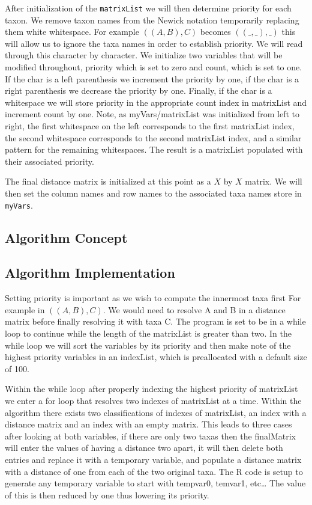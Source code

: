 \documentclass{article}
\begin{document}
After initialization of the {\tt matrixList} we will then determine priority for each taxon. We remove taxon names from the Newick notation temporarily replacing them white whitespace. For example $((A,B),C)$ becomes $((\_,\_),\_)$ this will allow us to ignore the taxa names in order to establish priority. We will read through this character by character. We initialize two variables that will be modified throughout, priority which is set to zero and count, which is set to one. If the char is a left parenthesis we increment the priority by one, if the char is a right parenthesis we decrease the priority by one. Finally, if the char is a whitespace we will store priority in the appropriate count index in matrixList and increment count by one. Note, as myVars/matrixList was initialized from left to right, the first whitespace on the left corresponds to the first matrixList index, the second whitespace corresponds to the second matrixList index, and a similar pattern for the remaining whitespaces. The result is a matrixList populated with their associated priority. 

The final distance matrix is initialized at this point as a $X$ by $X$ matrix. We will then set the column names and row names to the associated taxa names store in {\tt myVars}. 


\subsection{Algorithm Concept}


\subsection{Algorithm Implementation}
Setting priority is important as we wish to compute the innermost taxa first For example in $((A,B),C)$. We would need to resolve A and B in a distance matrix before finally resolving it with taxa C. The program is set to be in a while loop to continue while the length of the matrixList is greater than two. In the while loop we will sort the variables by its priority and then make note of the highest priority variables in an indexList, which is preallocated with a default size of 100.

Within the while loop after properly indexing the highest priority of matrixList we enter a for loop that resolves two indexes of matrixList at a time. Within the algorithm there exists two classifications of indexes of matrixList, an index with a distance matrix and an index with an empty matrix. This leads to three cases after looking at both variables, if there are only two taxas then the finalMatrix will enter the values of having a distance two apart, it will then delete both entries and replace it with a temporary variable, and populate a distance matrix with a distance of one from each of the two original taxa. The R code is setup to generate any temporary variable to start with tempvar0, temvar1, etc… The value of this is then reduced by one thus lowering its priority. 
\end{document}
